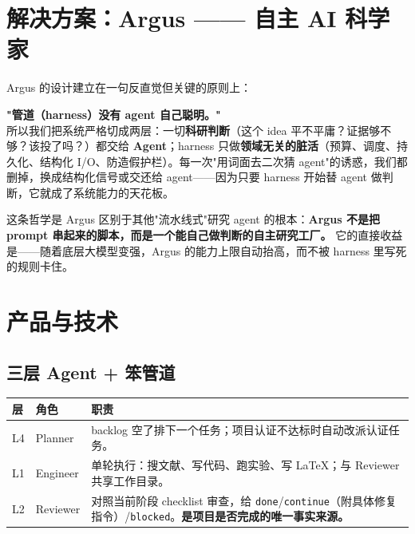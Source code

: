 \documentclass[UTF8,11pt,fontset=none]{ctexart}
\newcommand{\thd}[1]{\textbf{\color{white}#1}}
\newcommand{\headrow}{\rowcolor{argusnavy}}
\newcommand{\altrow}{\rowcolor{arguslight}}
\begin{document}
\section{解决方案：Argus —— 自主 AI 科学家}

Argus 的设计建立在一句反直觉但关键的原则上：

\begin{keybox}
\textbf{"管道（harness）没有 agent 自己聪明。"}\\[4pt]
所以我们把系统严格切成两层：一切\textbf{科研判断}（这个 idea 平不平庸？证据够不够？该投了吗？）都交给 \textbf{Agent}；harness 只做\textbf{领域无关的脏活}（预算、调度、持久化、结构化 I/O、防造假护栏）。每一次"用词面去二次猜 agent"的诱惑，我们都删掉，换成结构化信号或交还给 agent——因为只要 harness 开始替 agent 做判断，它就成了系统能力的天花板。
\end{keybox}

这条哲学是 Argus 区别于其他"流水线式"研究 agent 的根本：\textbf{Argus 不是把 prompt 串起来的脚本，而是一个能自己做判断的自主研究工厂。} 它的直接收益是——随着底层大模型变强，Argus 的能力上限自动抬高，而不被 harness 里写死的规则卡住。

\section{产品与技术}

\subsection{三层 Agent + 笨管道}

\begin{tabularx}{\textwidth}{@{}l l X@{}}
\toprule
\headrow \thd{层} & \thd{角色} & \thd{职责} \\
\midrule
\altrow L4 & Planner & backlog 空了排下一个任务；项目认证不达标时自动改派认证任务。 \\
L1 & Engineer & 单轮执行：搜文献、写代码、跑实验、写 LaTeX；与 Reviewer 共享工作目录。 \\
\altrow L2 & Reviewer & 对照当前阶段 checklist 审查，给 \texttt{done}/\texttt{continue}（附具体修复指令）/\texttt{blocked}。\textbf{是项目是否完成的唯一事实来源。} \\
\bottomrule
\end{tabularx}
\end{document}
